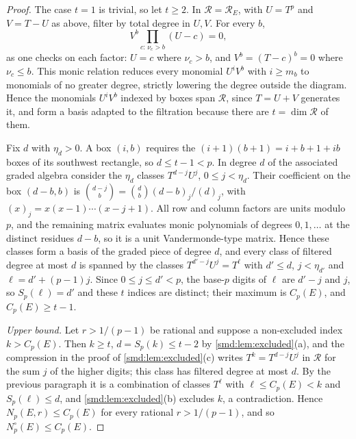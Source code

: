 \begin{proof}
The case $t=1$ is trivial, so let $t\ge2$. In $\mathcal R=\mathcal R_E$, with
$U=T^p$ and $V=T-U$ as above, filter by total degree in $U,V$. For every $b$,
\[
 V^b\prod_{c:\,\nu_c>b}(U-c)=0,
\]
as one checks on each factor: $U=c$ where $\nu_c>b$, and $V^b=(T-c)^b=0$ where
$\nu_c\le b$. This monic relation reduces every monomial $U^iV^b$ with $i\ge m_b$ to
monomials of no greater degree, strictly lowering the degree outside the diagram. Hence
the monomials $U^iV^b$ indexed by boxes span $\mathcal R$, since $T=U+V$ generates it, and
form a basis adapted to the filtration because there are $t=\dim\mathcal R$ of them.

Fix $d$ with $\eta_d>0$. A box $(i,b)$ requires the $(i+1)(b+1)=i+b+1+ib$ boxes of its
southwest rectangle, so $d\le t-1<p$. In degree $d$ of the associated graded algebra
consider the $\eta_d$ classes $T^{d-j}U^j$, $0\le j<\eta_d$. Their coefficient on the box
$(d-b,b)$ is $\binom{d-j}b=\binom db(d-b)_j/(d)_j$, with $(x)_j=x(x-1)\cdots(x-j+1)$. All
row and column factors are units modulo $p$, and the remaining matrix evaluates monic
polynomials of degrees $0,1,\dots$ at the distinct residues $d-b$, so it is a unit
Vandermonde-type matrix. Hence these classes form a basis of the graded piece of degree
$d$, and every class of filtered degree at most $d$ is spanned by the classes
$T^{d'-j}U^j=T^{\ell}$ with $d'\le d$, $j<\eta_{d'}$ and $\ell=d'+(p-1)j$. Since
$0\le j\le d'<p$, the base-$p$ digits of $\ell$ are $d'-j$ and $j$, so $S_p(\ell)=d'$ and
these $t$ indices are distinct; their maximum is $C_p(E)$, and $C_p(E)\ge t-1$.

\emph{Upper bound.} Let $r>1/(p-1)$ be rational and suppose a non-excluded index
$k>C_p(E)$. Then $k\ge t$, $d=S_p(k)\le t-2$ by \cref{smd:lem:excluded}(a), and the
compression in the proof of \cref{smd:lem:excluded}(c) writes $T^k=T^{d-j}U^j$ in
$\mathcal R$ for the sum $j$ of the higher digits; this class has filtered degree at most
$d$. By the previous paragraph it is a combination of classes $T^\ell$ with
$\ell\le C_p(E)<k$ and $S_p(\ell)\le d$, and \cref{smd:lem:excluded}(b) excludes $k$, a
contradiction. Hence $N_p(E,r)\le C_p(E)$ for every rational $r>1/(p-1)$, and so
$N^\circ_p(E)\le C_p(E)$.


\end{proof}
